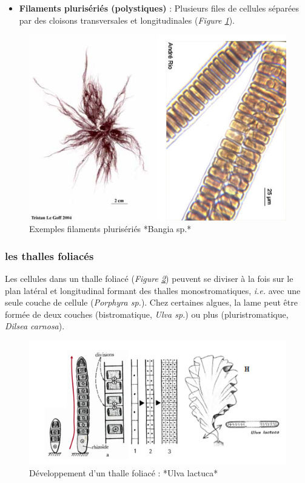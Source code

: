 \documentclass[
]{book}
\providecommand{\tightlist}{%
  \setlength{\itemsep}{0pt}\setlength{\parskip}{0pt}}
\begin{document}
\begin{itemize}
\tightlist
\item
  \textbf{Filaments plurisériés (polystiques)} : Plusieurs files de cellules séparées par des cloisons transversales et longitudinales (\emph{Figure \ref{fig:polystique}}).
\end{itemize}

\begin{figure}[H]

{\centering \includegraphics[width=0.7\linewidth]{./images/polystique} 

}

\caption{Exemples filaments plurisériés *Bangia sp.*}\label{fig:polystique}
\end{figure}

\hypertarget{les-thalles-foliacuxe9s}{%
\subsubsection{les thalles foliacés}\label{les-thalles-foliacuxe9s}}

Les cellules dans un thalle foliacé (\emph{Figure \ref{fig:thallefoliace}}) peuvent se diviser à la fois sur le plan latéral et longitudinal formant des thalles monostromatiques, \emph{i.e.} avec une seule couche de cellule (\emph{Porphyra sp.}). Chez certaines algues, la lame peut être formée de deux couches (bistromatique, \emph{Ulva sp.}) ou plus (pluristromatique, \emph{Dilsea carnosa}).

\begin{figure}[H]

{\centering \includegraphics[width=0.7\linewidth]{./images/thallefoliace} 

}

\caption{Développement d'un thalle foliacé : *Ulva lactuca*}\label{fig:thallefoliace}
\end{figure}
\end{document}
